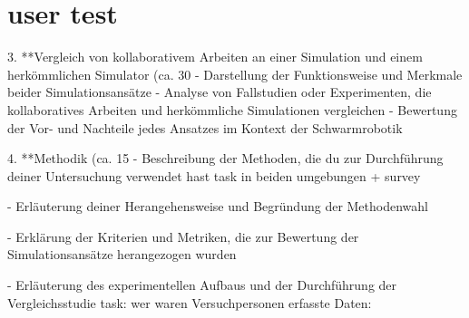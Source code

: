 \documentclass[german,version-2020-11]{uzl-thesis}
\begin{document}
\chapter{user test} 
   
   3. **Vergleich von kollaborativem Arbeiten an einer Simulation und einem herkömmlichen Simulator (ca. 30%
      - Darstellung der Funktionsweise und Merkmale beider Simulationsansätze
      - Analyse von Fallstudien oder Experimenten, die kollaboratives Arbeiten und herkömmliche Simulationen vergleichen
      - Bewertung der Vor- und Nachteile jedes Ansatzes im Kontext der Schwarmrobotik
   
   4. **Methodik (ca. 15%
      - Beschreibung der Methoden, die du zur Durchführung deiner Untersuchung verwendet hast
        task in beiden umgebungen + survey
      
        - Erläuterung deiner Herangehensweise und Begründung der Methodenwahl 
      
      - Erklärung der Kriterien und Metriken, die zur Bewertung der Simulationsansätze herangezogen wurden

      - Erläuterung des experimentellen Aufbaus und der Durchführung der Vergleichsstudie
      task:
      wer waren Versuchpersonen
      erfasste Daten:
\end{document}
